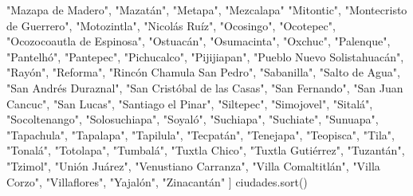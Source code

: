 \documentclass[
  letterpaper,
  DIV=11,
  numbers=noendperiod]{scrreprt}
\newenvironment{Shaded}{\begin{snugshade}}{\end{snugshade}}
\newcommand{\NormalTok}[1]{\textcolor[rgb]{0.00,0.23,0.31}{#1}}
\newcommand{\StringTok}[1]{\textcolor[rgb]{0.13,0.47,0.30}{#1}}
\begin{document}
\begin{Shaded}
\begin{Highlighting}[]
    \StringTok{"Mazapa de Madero"}\NormalTok{, }\StringTok{"Mazatán"}\NormalTok{, }\StringTok{"Metapa"}\NormalTok{, }\StringTok{"Mezcalapa"}  \StringTok{"Mitontic"}\NormalTok{, }
    \StringTok{"Montecristo de Guerrero"}\NormalTok{, }\StringTok{"Motozintla"}\NormalTok{, }\StringTok{"Nicolás Ruíz"}\NormalTok{, }\StringTok{"Ocosingo"}\NormalTok{, }
    \StringTok{"Ocotepec"}\NormalTok{, }\StringTok{"Ocozocoautla de Espinosa"}\NormalTok{, }\StringTok{"Ostuacán"}\NormalTok{, }\StringTok{"Osumacinta"}\NormalTok{, }
    \StringTok{"Oxchuc"}\NormalTok{, }\StringTok{"Palenque"}\NormalTok{, }\StringTok{"Pantelhó"}\NormalTok{, }\StringTok{"Pantepec"}\NormalTok{, }\StringTok{"Pichucalco"}\NormalTok{,}
    \StringTok{"Pijijiapan"}\NormalTok{, }\StringTok{"Pueblo Nuevo Solistahuacán"}\NormalTok{, }\StringTok{"Rayón"}\NormalTok{, }\StringTok{"Reforma"}\NormalTok{, }
    \StringTok{"Rincón Chamula San Pedro"}\NormalTok{, }\StringTok{"Sabanilla"}\NormalTok{, }\StringTok{"Salto de Agua"}\NormalTok{, }
    \StringTok{"San Andrés Duraznal"}\NormalTok{, }\StringTok{"San Cristóbal de las Casas"}\NormalTok{, }\StringTok{"San Fernando"}\NormalTok{, }
    \StringTok{"San Juan Cancuc"}\NormalTok{, }\StringTok{"San Lucas"}\NormalTok{, }\StringTok{"Santiago el Pinar"}\NormalTok{, }\StringTok{"Siltepec"}\NormalTok{, }
    \StringTok{"Simojovel"}\NormalTok{, }\StringTok{"Sitalá"}\NormalTok{, }\StringTok{"Socoltenango"}\NormalTok{, }\StringTok{"Solosuchiapa"}\NormalTok{, }\StringTok{"Soyaló"}\NormalTok{, }
    \StringTok{"Suchiapa"}\NormalTok{, }\StringTok{"Suchiate"}\NormalTok{, }\StringTok{"Sunuapa"}\NormalTok{, }\StringTok{"Tapachula"}\NormalTok{, }\StringTok{"Tapalapa"}\NormalTok{, }\StringTok{"Tapilula"}\NormalTok{,}
    \StringTok{"Tecpatán"}\NormalTok{, }\StringTok{"Tenejapa"}\NormalTok{, }\StringTok{"Teopisca"}\NormalTok{, }\StringTok{"Tila"}\NormalTok{, }\StringTok{"Tonalá"}\NormalTok{, }\StringTok{"Totolapa"}\NormalTok{,}
    \StringTok{"Tumbalá"}\NormalTok{, }\StringTok{"Tuxtla Chico"}\NormalTok{, }\StringTok{"Tuxtla Gutiérrez"}\NormalTok{, }\StringTok{"Tuzantán"}\NormalTok{, }\StringTok{"Tzimol"}\NormalTok{, }
    \StringTok{"Unión Juárez"}\NormalTok{, }\StringTok{"Venustiano Carranza"}\NormalTok{,  }\StringTok{"Villa Comaltitlán"}\NormalTok{, }
    \StringTok{"Villa Corzo"}\NormalTok{, }\StringTok{"Villaflores"}\NormalTok{, }\StringTok{"Yajalón"}\NormalTok{, }\StringTok{"Zinacantán"}
\NormalTok{]}
\NormalTok{ciudades.sort()}


\end{Highlighting}
\end{Shaded}
\end{document}
